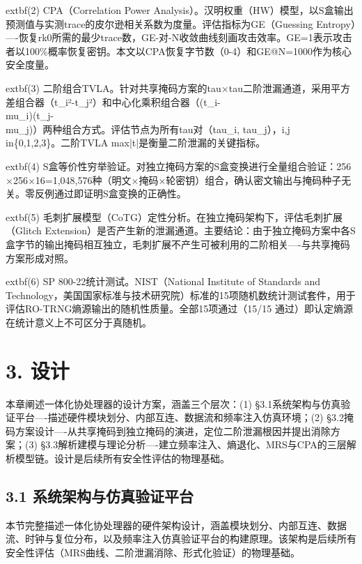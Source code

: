 \documentclass[journal]{IEEEtran}
\begin{document}
	extbf{(2) CPA（Correlation Power Analysis）}。汉明权重（HW）模型，以S盒输出预测值与实测trace的皮尔逊相关系数为度量。评估指标为GE（Guessing Entropy）----恢复rk0所需的最少trace数，GE-对-N收敛曲线刻画攻击效率。GE=1表示攻击者以100\%概率恢复密钥。本文以CPA恢复字节数（0-4）和GE@N=1000作为核心安全度量。

	extbf{(3) 二阶组合TVLA}。针对共享掩码方案的tau$\times$tau二阶泄漏通道，采用平方差组合器（t\_i²-t\_j²）和中心化乘积组合器（(t\_i-\\mu\_i)(t\_j-\\mu\_j)）两种组合方式。评估节点为所有tau对（tau\_i, tau\_j），i,j\\in\{0,1,2,3\}。二阶TVLA max|t|是衡量二阶泄漏的关键指标。

	extbf{(4) S盒等价性穷举验证}。对独立掩码方案的S盒变换进行全量组合验证：256$\times$256$\times$16=1,048,576种（明文$\times$掩码$\times$轮密钥）组合，确认密文输出与掩码种子无关。零反例通过即证明S盒变换的正确性。

	extbf{(5) 毛刺扩展模型（CoTG）定性分析}。在独立掩码架构下，评估毛刺扩展（Glitch Extension）是否产生新的泄漏通道。主要结论：由于独立掩码方案中各S盒字节的输出掩码相互独立，毛刺扩展不产生可被利用的二阶相关----与共享掩码方案形成对照。

	extbf{(6) SP 800-22统计测试}。NIST（National Institute of Standards and Technology，美国国家标准与技术研究院）标准的15项随机数统计测试套件，用于评估RO-TRNG熵源输出的随机性质量。全部15项通过（15/15 通过）即认定熵源在统计意义上不可区分于真随机。

%


\section{3. 设计}

本章阐述一体化协处理器的设计方案，涵盖三个层次：(1) §3.1系统架构与仿真验证平台----描述硬件模块划分、内部互连、数据流和频率注入仿真环境；(2) §3.2掩码方案设计----从共享掩码到独立掩码的演进，定位二阶泄漏根因并提出消除方案；(3) §3.3解析建模与理论分析----建立频率注入、熵退化、MRS与CPA的三层解析模型链。设计是后续所有安全性评估的物理基础。

\subsection{3.1 系统架构与仿真验证平台}

本节完整描述一体化协处理器的硬件架构设计，涵盖模块划分、内部互连、数据流、时钟与复位分布，以及频率注入仿真验证平台的构建原理。该架构是后续所有安全性评估（MRS曲线、二阶泄漏消除、形式化验证）的物理基础。
\end{document}
